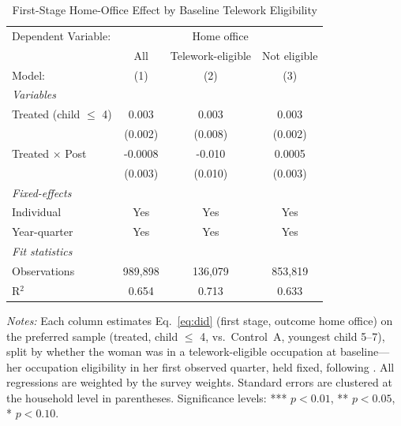 
\begin{table}[H]
   \caption{\label{tab:mech_moderation} First-Stage Home-Office Effect by Baseline Telework Eligibility}
   \centering
\small\setlength{\tabcolsep}{5pt}
   \begin{tabular}{lccc}
      \toprule
      Dependent Variable: & \multicolumn{3}{c}{Home office}\\
                                & All     & Telework-eligible & Not eligible \\   
      Model:                    & (1)     & (2)               & (3)\\  
      \midrule
      \emph{Variables}\\
      Treated (child $\leq$ 4)  & 0.003   & 0.003             & 0.003\\   
                                & (0.002) & (0.008)           & (0.002)\\   
\addlinespace[2pt]
      Treated $\times$ Post     & -0.0008 & -0.010            & 0.0005\\   
                                & (0.003) & (0.010)           & (0.003)\\   
\addlinespace[2pt]
      \midrule
      \emph{Fixed-effects}\\
      Individual                & Yes     & Yes               & Yes\\  
      Year-quarter              & Yes     & Yes               & Yes\\  
      \midrule
      \emph{Fit statistics}\\
      Observations              & 989,898 & 136,079           & 853,819\\  
      R$^2$                     & 0.654   & 0.713             & 0.633\\  
\bottomrule
   \end{tabular}
   
   \par \raggedright 
   \footnotesize\textit{Notes:} Each column estimates Eq.~\eqref{eq:did} (first stage, outcome home office) on the preferred sample (treated, child $\leq$ 4, vs.\ Control~A, youngest child 5--7), split by whether the woman was in a telework-eligible occupation at baseline---her occupation eligibility in her first observed quarter, held fixed, following \citet{costa2024}. All regressions are weighted by the survey weights. Standard errors are clustered at the household level in parentheses. Significance levels: *** $p<0.01$, ** $p<0.05$, * $p<0.10$.
\end{table}


